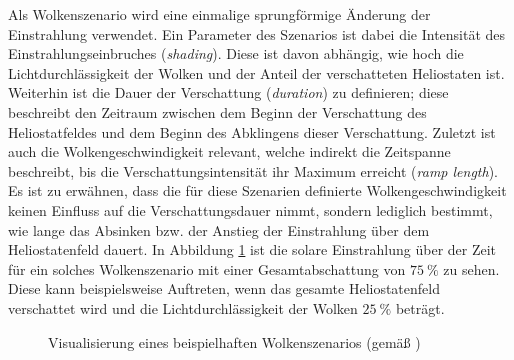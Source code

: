 Als Wolkenszenario wird eine einmalige sprungförmige Änderung der Einstrahlung verwendet.
Ein Parameter des Szenarios ist dabei die Intensität des Einstrahlungseinbruches (\textit{shading}).
Diese ist davon abhängig, wie hoch die Lichtdurchlässigkeit der Wolken und der Anteil der verschatteten Heliostaten ist.
Weiterhin ist die Dauer der Verschattung (\textit{duration}) zu definieren; diese beschreibt den Zeitraum zwischen dem Beginn der Verschattung des Heliostatfeldes und dem Beginn des Abklingens dieser Verschattung.
Zuletzt ist auch die Wolkengeschwindigkeit relevant, welche indirekt die Zeitspanne beschreibt, bis die Verschattungsintensität ihr Maximum erreicht (\textit{ramp length}).
Es ist zu erwähnen, dass die für diese Szenarien definierte Wolkengeschwindigkeit keinen Einfluss auf die Verschattungsdauer nimmt, sondern lediglich bestimmt, wie lange das Absinken bzw. der Anstieg der Einstrahlung über dem Heliostatenfeld dauert.
In Abbildung \ref{fig_TestszenarioWolken} ist die solare Einstrahlung über der Zeit für ein solches Wolkenszenario mit einer Gesamtabschattung von $\SI{75}{\percent}$ zu sehen.
Diese kann beispielsweise Auftreten, wenn das gesamte Heliostatenfeld verschattet wird und die Lichtdurchlässigkeit der Wolken $\SI{25}{\percent}$ beträgt.

\begin{figure}[h!]
    \centering
    \setlength{\fboxsep}{1pt}
    \setlength{\fboxrule}{1pt}
    \caption[Visualisierung eines beispielhaften Wolkenszenarios]{Visualisierung eines beispielhaften Wolkenszenarios (gemäß \cite[S.62]{DissHirsch})}
    \label{fig_TestszenarioWolken}
\end{figure} \pagebreak

